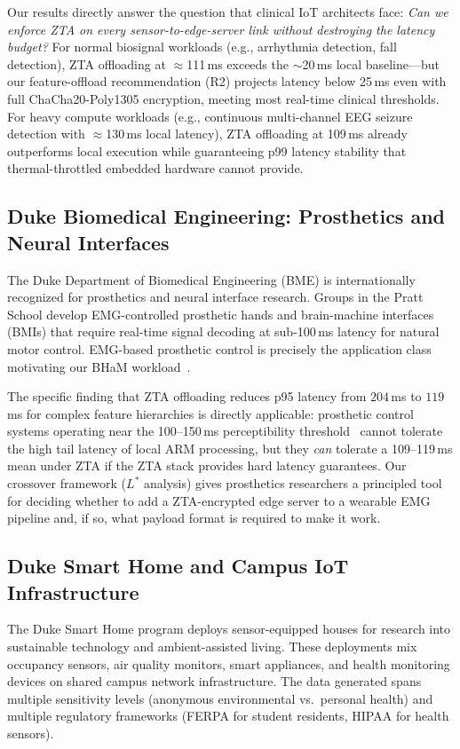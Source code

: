 \documentclass[10pt,twocolumn]{article}
\begin{document}
Our results directly answer the question that clinical IoT architects face:
\emph{Can we enforce ZTA on every sensor-to-edge-server link without
destroying the latency budget?}  For normal biosignal workloads
(e.g., arrhythmia detection, fall detection), ZTA offloading at $\approx$111\,ms
exceeds the $\sim$20\,ms local baseline—but our feature-offload
recommendation (R2) projects latency below 25\,ms even with full
ChaCha20-Poly1305 encryption, meeting most real-time clinical thresholds.
For heavy compute workloads (e.g., continuous multi-channel EEG seizure
detection with $\approx$130\,ms local latency), ZTA offloading at 109\,ms
already outperforms local execution while guaranteeing p99 latency stability
that thermal-throttled embedded hardware cannot provide.

\subsection{Duke Biomedical Engineering: Prosthetics and Neural Interfaces}

The Duke Department of Biomedical Engineering (BME) is internationally
recognized for prosthetics and neural interface research.  Groups in the Pratt
School develop EMG-controlled prosthetic hands and brain-machine interfaces
(BMIs) that require real-time signal decoding at sub-100\,ms latency for
natural motor control.  EMG-based prosthetic control is precisely the
application class motivating our BHaM workload~\cite{bham_dataset}.

The specific finding that ZTA offloading reduces p95 latency from
$204$\,ms to $119$\,ms for complex feature hierarchies is directly applicable:
prosthetic control systems operating near the 100--150\,ms perceptibility
threshold~\cite{zanghieri2019tcn} cannot tolerate the high tail latency of
local ARM processing, but they \emph{can} tolerate a 109--119\,ms mean
under ZTA if the ZTA stack provides hard latency guarantees.  Our crossover
framework ($L^*$ analysis) gives prosthetics researchers a principled tool
for deciding whether to add a ZTA-encrypted edge server to a wearable EMG
pipeline and, if so, what payload format is required to make it work.

\subsection{Duke Smart Home and Campus IoT Infrastructure}

The Duke Smart Home program deploys sensor-equipped houses for research into
sustainable technology and ambient-assisted living.  These deployments mix
occupancy sensors, air quality monitors, smart appliances, and health
monitoring devices on shared campus network infrastructure.  The data
generated spans multiple sensitivity levels (anonymous environmental vs.\
personal health) and multiple regulatory frameworks (FERPA for student
residents, HIPAA for health sensors).
\end{document}
